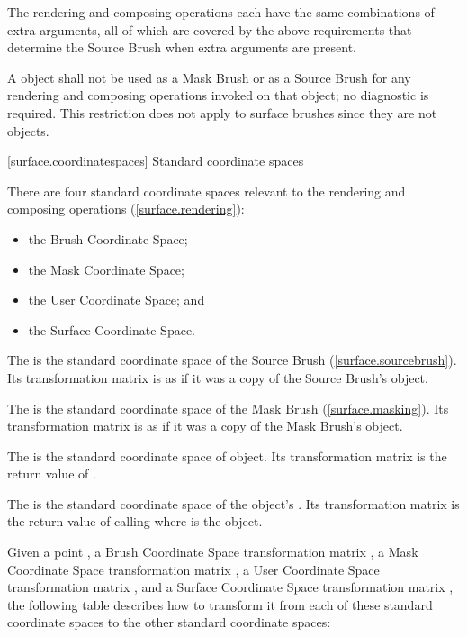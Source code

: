 \pnum
\enternote
The rendering and composing operations each have the same combinations of extra arguments, all of which are covered by the above requirements that determine the Source Brush when extra arguments are present.
\exitnote

\pnum
A  object shall not be used as a Mask Brush or as a Source Brush for any rendering and composing operations invoked on that  object; no diagnostic is required.
\enternote
This restriction does not apply to surface brushes since they are not  objects.
\exitnote

 [surface.coordinatespaces] {Standard coordinate spaces}

\pnum
There are four standard coordinate spaces relevant to the rendering and composing operations (\ref{surface.rendering}):
\begin{itemize}
\item the Brush Coordinate Space;
\item the Mask Coordinate Space;
\item the User Coordinate Space; and
\item the Surface Coordinate Space.
\end{itemize}

\pnum
The  is the standard coordinate space of the Source Brush (\ref{surface.sourcebrush}). Its transformation matrix is as if it was a copy of the Source Brush's  object.

\pnum
The  is the standard coordinate space of the Mask Brush (\ref{surface.masking}). Its transformation matrix is as if it was a copy of the Mask Brush's  object.

\pnum
The  is the standard coordinate space of  object. Its transformation matrix is the return value of .

\pnum
The  is the standard coordinate space of the  object's \underlyingsurface. Its transformation matrix is the return value of calling  where  is the  object.

\pnum
Given a point , a Brush Coordinate Space transformation matrix , a Mask Coordinate Space transformation matrix , a User Coordinate Space transformation matrix , and a Surface Coordinate Space transformation matrix , the following table describes how to transform it from each of these standard coordinate spaces to the other standard coordinate spaces:


